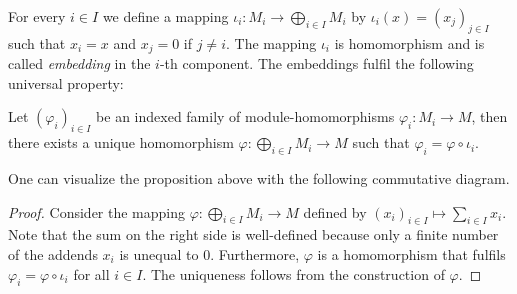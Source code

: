 For every $i\in I$ we define a mapping $\iota_i\colon M_i\to \bigoplus_{i\in I}M_i$ by $\iota_i(x)=(x_j)_{j\in I}$ such that $x_i=x$ and $x_j=0$ if $j\neq i$. The mapping $\iota_i$ is homomorphism and is called \textit{embedding} in the $i$-th component. The embeddings fulfil the following universal property:

\begin{pro}\label{prop.UniversalPropertyDirectSum}
Let $(\varphi_i)_{i\in I}$ be an indexed family of module-homomorphisms $\varphi_i\colon M_i\to M$, then there exists a unique homomorphism $\varphi\colon\bigoplus_{i\in I}M_i\to M$ such that $\varphi_i=\varphi\circ\iota_i$.
\end{pro}

One can visualize the proposition above with the following commutative diagram.
\begin{center}
\end{center}


\begin{proof}
Consider the mapping $\varphi\colon\bigoplus_{i\in I}M_i\to M$ defined by $(x_i)_{i\in I}\mapsto\sum_{i\in I}x_i$. Note that the sum on the right side is well-defined because only a finite number of the addends $x_i$ is unequal to 0. Furthermore, $\varphi$ is a homomorphism that fulfils $\varphi_i=\varphi\circ\iota_i$ for all $i\in I$. The uniqueness follows from the construction of $\varphi$.
\end{proof}

%
